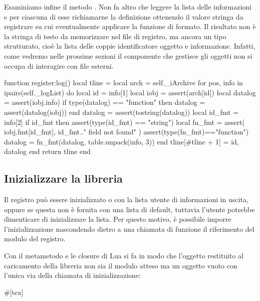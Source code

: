 Esaminiamo infine il metodo . Non fa altro che leggere la lista delle
informazioni e per ciascuna di esse richiamarne la definizione ottenendo il
valore stringa da registrare su cui eventualmente applicare la funzione di
formato. Il risultato non è la stringa di testo da memorizzare nel file di
registro, ma ancora un tipo strutturato, cioè la lista delle coppie
identificatore oggetto e informazione. Infatti, come vedremo nelle prossime
sezioni il componente che gestisce gli oggetti  non si occupa di
interagire con file esterni.
\begin{lines}
function register:log()
    local tline = {}
    local arch = self._iArchive
    for pos, info in ipairs(self._logList) do
        local id = info[1]
        local iobj = assert(arch[id])
        local datalog = assert(iobj.info)
        if type(datalog) == "function" then
            datalog = assert(datalog(iobj))
        end
        datalog = assert(tostring(datalog))
        local id_fmt = info[2]
        if id_fmt then
            assert(type(id_fmt) == "string")
            local fn_fmt = assert(
                iobj.fmt[id_fmt], id_fmt.." field not found"
            )
            assert(type(fn_fmt)=="function")
            datalog = fn_fmt(datalog, table.unpack(info, 3))
        end
        tline[#tline + 1] = {id, datalog}
    end
    return tline
end
\end{lines}

\subsection{Inizializzare la libreria}

Il registro può essere inizializzato o con la lista utente di informazioni in
uscita, oppure se questa non è fornita con una lista di default, tuttavia
l'utente potrebbe dimenticare di inizializzare la lista. Per questo motivo, è
possibile imporre l'inizializzazione nascondendo dietro a una chiamata di
funzione il riferimento del modulo del registro.

Con il metametodo  e le closure di Lua si fa in modo che l'oggetto
restituito al caricamento della libreria non sia il modulo atteso 
ma un oggetto vuoto con l'unica via della chiamata di inizializzazione:
\begin{lines}
#[tex]
\end{lines}

